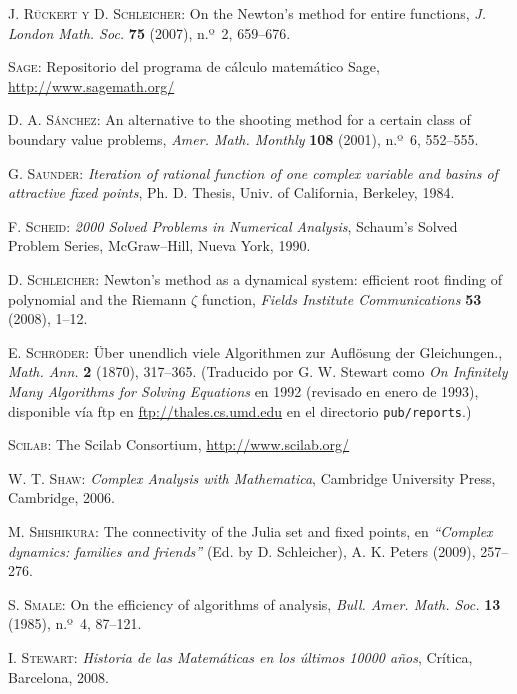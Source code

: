 \begin{thebibliography}{999}
\textsc{J. R\"uckert y D. Schleicher}:
{On the Newton's method for entire functions},
\textit{J. London Math. Soc.} \textbf{75} (2007), n.º~2, 659--676.

\textsc{Sage}:
Repositorio del programa de cálculo matemático Sage,
\url{http://www.sagemath.org/}


\textsc{D. A. S\'anchez}:
An alternative to the shooting method for a certain class of boundary value problems,
 \textit{Amer. Math. Monthly} \textbf{108} (2001), n.º~6,  552--555.

\textsc{G. Saunder}:
 \textit{Iteration of rational function of one complex variable and basins of attractive fixed points},
 Ph. D. Thesis, Univ. of California, Berkeley, 1984.

\textsc{F. Scheid}:
\textit{2000 Solved Problems in Numerical Analysis},
Schaum's Solved Problem Series, McGraw--Hill,  Nueva York, 1990.

\textsc{D. Schleicher}:
{Newton's method as a dynamical system: efficient root finding of polynomial and the Riemann $\zeta$ function},
\textit{Fields Institute Communications} \textbf{53} (2008), 1--12.


\textsc{E. Schröder}:
{Über unendlich viele Algorithmen zur
Auflösung der Gleichungen.},
\textit{Math. Ann.} \textbf{2} (1870), 317--365.
(Traducido por G. W. Stewart como \emph{On Infinitely Many Algorithms for
 Solving Equations} en 1992 (revisado en enero de 1993), disponible
 vía ftp en \url{ftp://thales.cs.umd.edu} en el directorio \texttt{pub/reports}.)
 
\textsc{Scilab}:
The Scilab Consortium,
\url{http://www.scilab.org/}


 \textsc{W. T. Shaw}:
\textit{Complex Analysis with Mathematica},
Cambridge University Press, Cambridge, 2006.

\textsc{M. Shishikura}: 
The connectivity of the Julia set and fixed points, en \textit{``Complex dynamics: families and friends''} 
(Ed. by D. Schleicher), A. K. Peters (2009), 257--276.


\textsc{S. Smale}:
{On the efficiency of algorithms of analysis},
\textit{Bull. Amer. Math. Soc.} \textbf{13} (1985), n.º~4, 87--121.


\textsc{I. Stewart}:
\textit{Historia de las Matemáticas en los últimos 10000 años},
Crítica, Barcelona, 2008.


\end{thebibliography}
